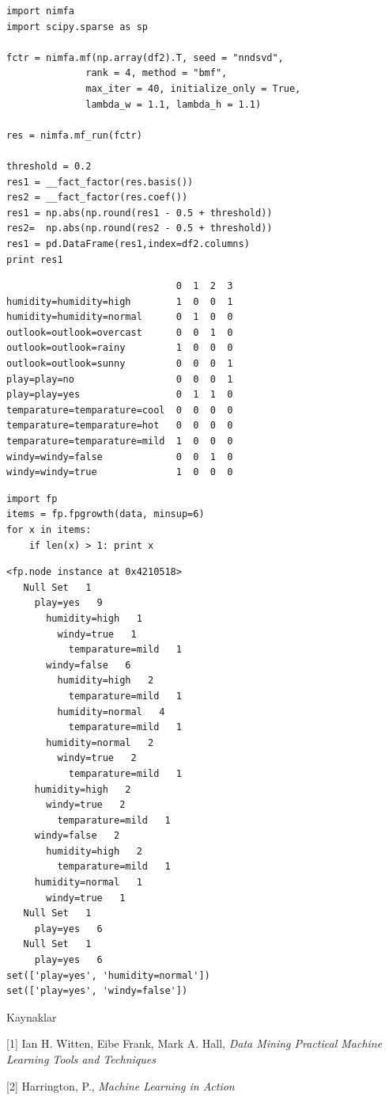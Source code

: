 \documentclass[12pt,fleqn]{article}\usepackage{../common}
\begin{document}
\begin{verbatim}
import nimfa
import scipy.sparse as sp

fctr = nimfa.mf(np.array(df2).T, seed = "nndsvd", 
              rank = 4, method = "bmf", 
              max_iter = 40, initialize_only = True,
              lambda_w = 1.1, lambda_h = 1.1)

res = nimfa.mf_run(fctr)

threshold = 0.2
res1 = __fact_factor(res.basis())
res2 = __fact_factor(res.coef())
res1 = np.abs(np.round(res1 - 0.5 + threshold))
res2=  np.abs(np.round(res2 - 0.5 + threshold))
res1 = pd.DataFrame(res1,index=df2.columns)
print res1
\end{verbatim}

\begin{verbatim}
                              0  1  2  3
humidity=humidity=high        1  0  0  1
humidity=humidity=normal      0  1  0  0
outlook=outlook=overcast      0  0  1  0
outlook=outlook=rainy         1  0  0  0
outlook=outlook=sunny         0  0  0  1
play=play=no                  0  0  0  1
play=play=yes                 0  1  1  0
temparature=temparature=cool  0  0  0  0
temparature=temparature=hot   0  0  0  0
temparature=temparature=mild  1  0  0  0
windy=windy=false             0  0  1  0
windy=windy=true              1  0  0  0
\end{verbatim}

\begin{verbatim}
import fp
items = fp.fpgrowth(data, minsup=6)
for x in items:
    if len(x) > 1: print x
\end{verbatim}

\begin{verbatim}
<fp.node instance at 0x4210518>
   Null Set   1
     play=yes   9
       humidity=high   1
         windy=true   1
           temparature=mild   1
       windy=false   6
         humidity=high   2
           temparature=mild   1
         humidity=normal   4
           temparature=mild   1
       humidity=normal   2
         windy=true   2
           temparature=mild   1
     humidity=high   2
       windy=true   2
         temparature=mild   1
     windy=false   2
       humidity=high   2
         temparature=mild   1
     humidity=normal   1
       windy=true   1
   Null Set   1
     play=yes   6
   Null Set   1
     play=yes   6
set(['play=yes', 'humidity=normal'])
set(['play=yes', 'windy=false'])
\end{verbatim}

Kaynaklar

[1] Ian H. Witten, Eibe Frank, Mark A. Hall, {\em Data Mining Practical Machine Learning Tools and Techniques}

[2] Harrington, P., {\em Machine Learning in Action}
\end{document}
